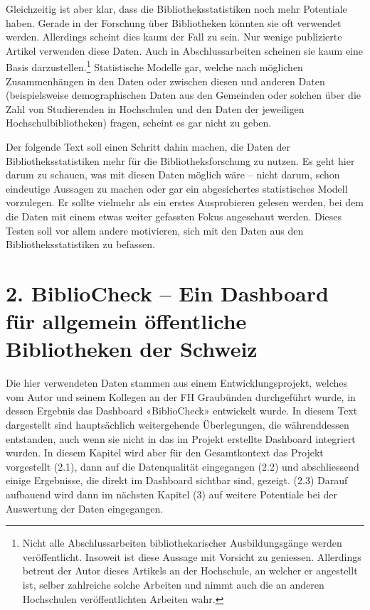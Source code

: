 \documentclass[a4paper,
fontsize=11pt,
oneside,
numbers=noperiodatend,
parskip=half-,
bibliography=totoc,
final
]{scrartcl}
\begin{document}
Gleichzeitig ist aber klar, dass die Bibliotheksstatistiken noch mehr
Potentiale haben. Gerade in der Forschung über Bibliotheken könnten sie
oft verwendet werden. Allerdings scheint dies kaum der Fall zu sein. Nur
wenige publizierte Artikel verwenden diese Daten. Auch in
Abschlussarbeiten scheinen sie kaum eine Basis darzustellen.\footnote{Nicht
  alle Abschlussarbeiten bibliothekarischer Ausbildungsgänge werden
  veröffentlicht. Insoweit ist diese Aussage mit Vorsicht zu geniessen.
  Allerdings betreut der Autor dieses Artikels an der Hochschule, an
  welcher er angestellt ist, selber zahlreiche solche Arbeiten und nimmt
  auch die an anderen Hochschulen veröffentlichten Arbeiten wahr.}
Statistische Modelle gar, welche nach möglichen Zusammenhängen in den
Daten oder zwischen diesen und anderen Daten (beispielsweise
demographischen Daten aus den Gemeinden oder solchen über die Zahl von
Studierenden in Hochschulen und den Daten der jeweiligen
Hochschulbibliotheken) fragen, scheint es gar nicht zu geben.

Der folgende Text soll einen Schritt dahin machen, die Daten der
Bibliotheksstatistiken mehr für die Bibliotheksforschung zu nutzen. Es
geht hier darum zu schauen, was mit diesen Daten möglich wäre -- nicht
darum, schon eindeutige Aussagen zu machen oder gar ein abgesichertes
statistisches Modell vorzulegen. Er sollte vielmehr als ein erstes
Ausprobieren gelesen werden, bei dem die Daten mit einem etwas weiter
gefassten Fokus angeschaut werden. Dieses Testen soll vor allem andere
motivieren, sich mit den Daten aus den Bibliotheksstatistiken zu
befassen.

\section{2. BiblioCheck -- Ein Dashboard für allgemein öffentliche
Bibliotheken der
Schweiz}\label{bibliocheck-ein-dashboard-fuxfcr-allgemein-uxf6ffentliche-bibliotheken-der-schweiz}

Die hier verwendeten Daten stammen aus einem Entwicklungsprojekt,
welches vom Autor und seinem Kollegen an der FH Graubünden durchgeführt
wurde, in dessen Ergebnis das Dashboard «BiblioCheck» entwickelt wurde.
In diesem Text dargestellt sind hauptsächlich weitergehende
Überlegungen, die währenddessen entstanden, auch wenn sie nicht in das
im Projekt erstellte Dashboard integriert wurden. In diesem Kapitel wird
aber für den Gesamtkontext das Projekt vorgestellt (2.1), dann auf die
Datenqualität eingegangen (2.2) und abschliessend einige Ergebnisse, die
direkt im Dashboard sichtbar sind, gezeigt. (2.3) Darauf aufbauend wird
dann im nächsten Kapitel (3) auf weitere Potentiale bei der Auswertung
der Daten eingegangen.
\end{document}
